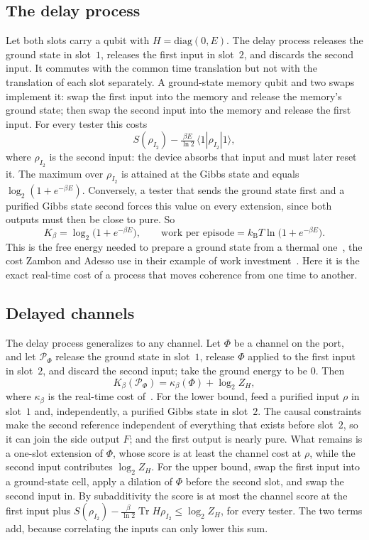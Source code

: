 \documentclass[11pt]{article}
\theoremstyle{definition}
\theoremstyle{remark}
\newcommand{\Tr}{\operatorname{Tr}}
\newcommand{\kB}{k_{\mathrm B}}
\newcommand{\Kb}{K_\beta}
\newcommand{\Trt}{\kappa_\beta}
\newcommand{\Pp}{\mathcal P}
\begin{document}
\subsection{The delay process}

Let both slots carry a qubit with $H=\mathrm{diag}(0,E)$. The delay process releases the ground state in slot~$1$, releases the first input in slot~$2$, and discards the second input. It commutes with the common time translation but not with the translation of each slot separately. A ground-state memory qubit and two swaps implement it: swap the first input into the memory and release the memory's ground state; then swap the second input into the memory and release the first input. For every tester this costs
\[
S(\rho_{I_2})-\tfrac{\beta E}{\ln2}\,\langle1|\rho_{I_2}|1\rangle,
\]
where $\rho_{I_2}$ is the second input: the device absorbs that input and must later reset it. The maximum over $\rho_{I_2}$ is attained at the Gibbs state and equals $\log_2(1+e^{-\beta E})$. Conversely, a tester that sends the ground state first and a purified Gibbs state second forces this value on every extension, since both outputs must then be close to pure. So
\[
\Kb=\log_2\bigl(1+e^{-\beta E}\bigr),\qquad\text{work per episode}=\kB T\ln\bigl(1+e^{-\beta E}\bigr).
\]
This is the free energy needed to prepare a ground state from a thermal one~\cite{HorodeckiOppenheim13,Brandao13}, the cost Zambon and Adesso use in their example of work investment~\cite{ZambonAdesso}. Here it is the exact real-time cost of a process that moves coherence from one time to another.

\subsection{Delayed channels}

The delay process generalizes to any channel. Let $\Phi$ be a channel on the port, and let $\Pp_\Phi$ release the ground state in slot~$1$, release $\Phi$ applied to the first input in slot~$2$, and discard the second input; take the ground energy to be $0$. Then
\[
\Kb(\Pp_\Phi)=\Trt(\Phi)+\log_2Z_H,
\]
where $\Trt$ is the real-time cost of~\cite{SaveWork}. For the lower bound, feed a purified input $\rho$ in slot~$1$ and, independently, a purified Gibbs state in slot~$2$. The causal constraints make the second reference independent of everything that exists before slot~$2$, so it can join the side output $F$; and the first output is nearly pure. What remains is a one-slot extension of $\Phi$, whose score is at least the channel cost at $\rho$, while the second input contributes $\log_2Z_H$. For the upper bound, swap the first input into a ground-state cell, apply a dilation of $\Phi$ before the second slot, and swap the second input in. By subadditivity the score is at most the channel score at the first input plus $S(\rho_{I_2})-\frac{\beta}{\ln2}\Tr H\rho_{I_2}\le\log_2Z_H$, for every tester. The two terms add, because correlating the inputs can only lower this sum.
\end{document}
